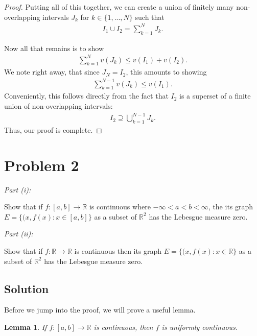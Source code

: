 \documentclass[10pt,a4paper]{article}
\makeatletter
\theoremstyle{theorem}
\newtheorem{lemma}{Lemma}
\newcommand{\proofpart}[2]{%
  \par
  \addvspace{\medskipamount}%
  \noindent\emph{Part #1: #2}\par\nobreak
  \addvspace{\smallskipamount}%
  \@afterheading
}
\theoremstyle{definition}
\makeatother
\begin{document}
\begin{proof}
Putting all of this together, we can create a union of finitely many non-overlapping intervals $J_k$ for $k \in\{ 1,...,N\}$ such that 
\begin{align*}
I_1 \cup I_2 = \sum_{k=1}^{N} J_k.
\end{align*}

Now all that remains is to show
\begin{align*}
\sum_{k=1}^N v(J_k) \leq v(I_1) + v(I_2).
\end{align*}
We note right away, that since $J_N = I_2$, this amounts to showing 
\begin{align*}
\sum_{k=1}^{N-1} v(J_k) \leq v(I_1).
\end{align*}
Conveniently,  this follows directly from the fact that $I_2$ is a superset of a finite union of non-overlapping intervals:
\begin{align*}
I_2 \supseteq \bigcup_{k=1}^{N-1} J_k.
\end{align*}
Thus, our proof is complete.
\end{proof}

\section*{Problem 2}
\proofpart{(i)}{} Show that if $f:[a,b] \to \mathbb{R}$ is continuous where $-\infty < a < b < \infty$, the its graph $E = \{(x, f(x): x \in [a, b] \}$ as a subset of $\mathbb{R}^2$ has the Lebesgue measure zero.

\proofpart{(ii)}{} Show that if $f:\mathbb{R} \to \mathbb{R}$ is continuous then its graph $E = \{(x, f(x): x \in \mathbb{R} \}$ as a subset of $\mathbb{R}^2$ has the Lebesgue measure zero.

\subsection*{Solution}
Before we jump into the proof, we will prove a useful lemma.
\begin{lemma}
If $f:[a,b] \to \mathbb{R}$ is continuous, then $f$ is uniformly continuous.
\end{lemma}
\end{document}
